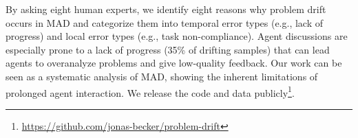 By asking eight human experts, we identify eight reasons why problem drift occurs in MAD and categorize them into temporal error types (e.g., lack of progress) and local error types (e.g., task non-compliance).
Agent discussions are especially prone to a lack of progress (35\% of drifting samples) that can lead agents to overanalyze problems and give low-quality feedback.
Our work can be seen as a systematic analysis of MAD, showing the inherent limitations of prolonged agent interaction.
We release the code and data publicly\footnote{\mbox{\url{https://github.com/jonas-becker/problem-drift}}}.


    
